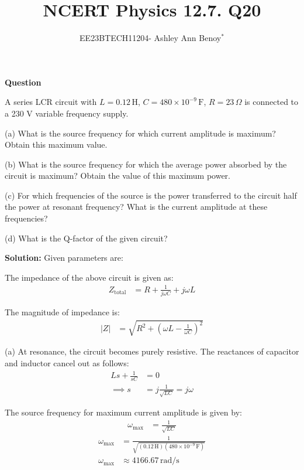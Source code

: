 \documentclass[journal,12pt,twocolumn]{IEEEtran}
\theoremstyle{remark}
\begin{document}

\vspace{3cm}

\title{NCERT Physics 12.7. Q20}
\author{EE23BTECH11204- Ashley Ann Benoy$^{*}$%
}
\maketitle
\newpage
\bigskip

\renewcommand{\thefigure}{\theenumi}
\renewcommand{\thetable}{\theenumi}



\textbf{Question}

A series LCR circuit with 
\(L = 0.12 \, \text{H}\),
\(C = 480 \times 10^{-9} \, \text{F}\), 
\(R=23 \, \Omega\)
is connected to a 230 V variable frequency supply.

(a) What is the source frequency for which current amplitude is maximum? Obtain this maximum value.

(b) What is the source frequency for which the average power absorbed by the circuit is maximum? Obtain the value of this maximum power.

(c) For which frequencies of the source is the power transferred to the circuit half the power at resonant frequency? What is the current amplitude at these frequencies?

(d) What is the Q-factor of the given circuit?

\textbf{Solution:}
Given parameters are:




The impedance of the above circuit is given as:
\begin{align}
    Z_{\text{total}} &= R + \frac{1}{j\omega C} + j\omega L
\end{align}

The magnitude of impedance is:
\begin{align}
    |Z| &= \sqrt{R^2 + \left(\omega L - \frac{1}{\omega C}\right)^2}
\end{align}

(a) At resonance, the circuit becomes purely resistive. The reactances of capacitor and inductor cancel out as follows:
\begin{align}
    Ls + \frac{1}{sC} &= 0 \\
    \implies s &= j\frac{1}{\sqrt{LC}} = j\omega
\end{align}

The source frequency for maximum current amplitude is given by:
\begin{align}
    \omega_{\text{max}} &= \frac{1}{\sqrt{LC}}
\end{align}
\begin{align}
    \omega_{\text{max}} &= \frac{1}{\sqrt{(0.12 \, \text{H})(480 \times 10^{-9} \, \text{F})}} \\
    \omega_{\text{max}} &\approx 4166.67 \, \text{rad/s}
\end{align}
\end{document}
